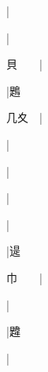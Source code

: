\begin{multicols}{2}
{{\cjk{}{\cnsym{}　}{\cnsym{}　}{\cnsym{}　}}|{}\par
{\cjk{}{\cnsym{}　}{\cnsym{}　}{\cnsym{}　}}|{}\par
{\cjk{}貝{\cnsym{}　}{\cnsym{}　}}|{}\par
{\cjk{}{\cnsym{}　}{\cnsym{}　}{\cnsym{}　}}|{\cjk{}鶗}\par
{\cjk{}几夊{\cnsym{}　}}|{}\par
{\cjk{}{\cnsym{}　}{\cnsym{}　}{\cnsym{}　}}|{}\par
{\cjk{}{\cnsym{}　}{\cnsym{}　}{\cnsym{}　}}|{}\par
{\cjk{}{\cnsym{}　}{\cnsym{}　}{\cnsym{}　}}|{}\par
{\cjk{}{\cnsym{}　}{\cnsym{}　}{\cnsym{}　}}|{}\par
{\cjk{}{\cnsym{}　}{\cnsym{}　}{\cnsym{}　}}|{\cjk{}遈}\par
{\cjk{}巾{\cnsym{}　}{\cnsym{}　}}|{}\par
{\cjk{}{\cnsym{}　}{\cnsym{}　}{\cnsym{}　}}|{}\par
{\cjk{}{\cnsym{}　}{\cnsym{}　}{\cnsym{}　}}|{\cjk{}韙}\par
{\cjk{}{\cnsym{}　}{\cnsym{}　}{\cnsym{}　}}|{}\par
}
\end{multicols}
